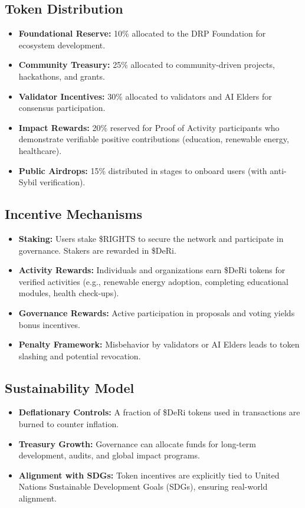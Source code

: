 \documentclass[11pt,a4paper]{article}
\begin{document}
\subsection{Token Distribution}
\begin{itemize}
    \item \textbf{Foundational Reserve:} 10\% allocated to the DRP Foundation for ecosystem development.  
    \item \textbf{Community Treasury:} 25\% allocated to community-driven projects, hackathons, and grants.  
    \item \textbf{Validator Incentives:} 30\% allocated to validators and AI Elders for consensus participation.  
    \item \textbf{Impact Rewards:} 20\% reserved for Proof of Activity participants who demonstrate verifiable positive contributions (education, renewable energy, healthcare).  
    \item \textbf{Public Airdrops:} 15\% distributed in stages to onboard users (with anti-Sybil verification).  
\end{itemize}

\subsection{Incentive Mechanisms}
\begin{itemize}
    \item \textbf{Staking:} Users stake \$RIGHTS to secure the network and participate in governance. Stakers are rewarded in \$DeRi.  
    \item \textbf{Activity Rewards:} Individuals and organizations earn \$DeRi tokens for verified activities (e.g., renewable energy adoption, completing educational modules, health check-ups).  
    \item \textbf{Governance Rewards:} Active participation in proposals and voting yields bonus incentives.  
    \item \textbf{Penalty Framework:} Misbehavior by validators or AI Elders leads to token slashing and potential revocation.  
\end{itemize}

\subsection{Sustainability Model}
\begin{itemize}
    \item \textbf{Deflationary Controls:} A fraction of \$DeRi tokens used in transactions are burned to counter inflation.  
    \item \textbf{Treasury Growth:} Governance can allocate funds for long-term development, audits, and global impact programs.  
    \item \textbf{Alignment with SDGs:} Token incentives are explicitly tied to United Nations Sustainable Development Goals (SDGs), ensuring real-world alignment.  
\end{itemize}
\end{document}
